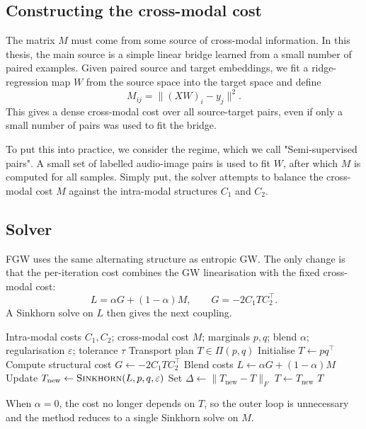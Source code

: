 \subsection{Constructing the cross-modal cost}

The matrix $M$ must come from some source of cross-modal information. In this thesis, the main source is a simple linear bridge learned from a small number of paired examples. Given paired source and target embeddings, we fit a ridge-regression map $W$ from the source space into the target space and define
\[
M_{ij} = \|(XW)_i - y_j\|^2.
\]
This gives a dense cross-modal cost over all source-target pairs, even if only a small number of pairs was used to fit the bridge.

To put this into practice, we consider the regime, which we call "Semi-supervised pairs". A small set of labelled audio-image pairs is used to fit $W$, after which $M$ is computed for all samples. Simply put, the solver attempts to balance the cross-modal cost $M$ against the intra-modal structures $C_1$ and $C_2$.

\subsection{Solver}

FGW uses the same alternating structure as entropic GW. The only change is that the per-iteration cost combines the GW linearisation with the fixed cross-modal cost:
\[
L = \alpha G + (1-\alpha)M,
\qquad
G = -2 C_1 T C_2^\top.
\]
A Sinkhorn solve on $L$ then gives the next coupling.

\begin{algorithm}[ht]
\caption{Entropic Fused Gromov-Wasserstein}
\label{alg:fgw}
\begin{algorithmic}[1]
\Require Intra-modal costs $C_1,C_2$; cross-modal cost $M$; marginals $p,q$; blend $\alpha$; regularisation $\varepsilon$; tolerance $\tau$
\Ensure Transport plan $T \in \Pi(p,q)$
\State Initialise $T \gets p q^\top$
\Repeat
    \State Compute structural cost $G \gets -2 C_1 T C_2^\top$
    \State Blend costs $L \gets \alpha G + (1-\alpha)M$
    \State Update $T_{\mathrm{new}} \gets \textsc{Sinkhorn}(L,p,q,\varepsilon)$
    \State Set $\Delta \gets \|T_{\mathrm{new}}-T\|_F$
    \State $T \gets T_{\mathrm{new}}$
\Until{$\Delta < \tau$}
\State \Return $T$
\end{algorithmic}
\end{algorithm}

When $\alpha=0$, the cost no longer depends on $T$, so the outer loop is unnecessary and the method reduces to a single Sinkhorn solve on $M$.

